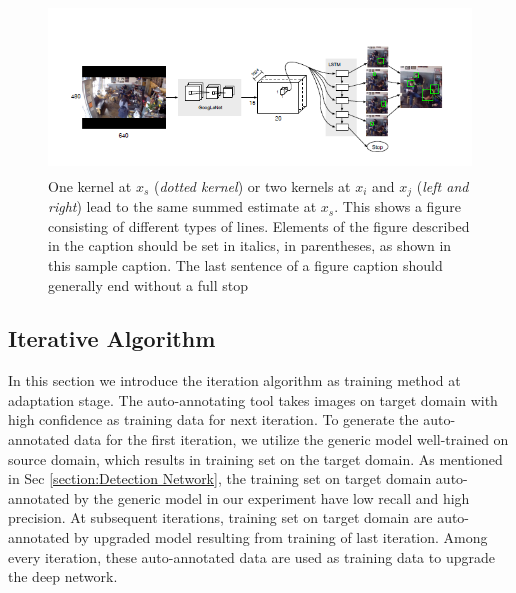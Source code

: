 \documentclass[runningheads]{llncs}
\begin{document}
\begin{figure}
\centering
\includegraphics[height=4.5cm]{images/dummyimage.png}
\caption{One kernel at $x_s$ ({\it dotted kernel}) or two kernels at
$x_i$ and $x_j$ ({\it left and right}) lead to the same summed estimate
at $x_s$. This shows a figure consisting of different types of
lines. Elements of the figure described in the caption should be set in
italics,
in parentheses, as shown in this sample caption. The last
sentence of a figure caption should generally end without a full stop}
\label{fig:example}
\end{figure}

\subsection{Iterative Algorithm}
\label{Section:Iterative Algorithm}
In this section we introduce the iteration algorithm as training method at adaptation stage. The auto-annotating tool takes images on target domain with high confidence as training data for next iteration. To generate the auto-annotated data for the first iteration, we utilize the generic model well-trained on source domain, which results in training set on the target domain. As mentioned in Sec \ref{section:Detection Network}, the training set on target domain auto-annotated by the generic model in our experiment have low recall and high precision. At subsequent iterations, training set on target domain are auto-annotated by upgraded model resulting from training of last iteration. Among every iteration, these auto-annotated data are used as training data to upgrade the deep network.
\end{document}
